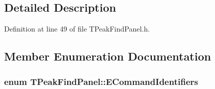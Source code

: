 \subsection{Detailed Description}


Definition at line 49 of file TPeakFindPanel.h.

\subsection{Member Enumeration Documentation}
\subsubsection[{ECommandIdentifiers}]{\setlength{\rightskip}{0pt plus 5cm}enum {\bf TPeakFindPanel::ECommandIdentifiers}\hspace{0.3cm}{\ttfamily  [protected]}}\label{classTPeakFindPanel_afbe6618ca662c0c51313b180272a7e06}
